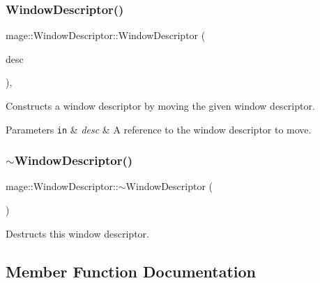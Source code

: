 \subsubsection{\texorpdfstring{Window\+Descriptor()}{WindowDescriptor()}\hspace{0.1cm}{\footnotesize\ttfamily [3/3]}}
{\footnotesize\ttfamily mage\+::\+Window\+Descriptor\+::\+Window\+Descriptor (\begin{DoxyParamCaption}\item[{\hyperlink{classmage_1_1_window_descriptor}{Window\+Descriptor} \&\&}]{desc }\end{DoxyParamCaption})\hspace{0.3cm}{\ttfamily [default]}, {\ttfamily [noexcept]}}

Constructs a window descriptor by moving the given window descriptor.


\begin{DoxyParams}[1]{Parameters}
\mbox{\tt in}  & {\em desc} & A reference to the window descriptor to move. \\
\hline
\end{DoxyParams}
\hypertarget{classmage_1_1_window_descriptor_ac73160dd1e90b9acf819164b774d5709}{}\label{classmage_1_1_window_descriptor_ac73160dd1e90b9acf819164b774d5709} 
\subsubsection{\texorpdfstring{$\sim$\+Window\+Descriptor()}{~WindowDescriptor()}}
{\footnotesize\ttfamily mage\+::\+Window\+Descriptor\+::$\sim$\+Window\+Descriptor (\begin{DoxyParamCaption}{ }\end{DoxyParamCaption})}

Destructs this window descriptor. 

\subsection{Member Function Documentation}
\hypertarget{classmage_1_1_window_descriptor_a09423845e3cc6bd451e280a92222ca14}{}\label{classmage_1_1_window_descriptor_a09423845e3cc6bd451e280a92222ca14} 
